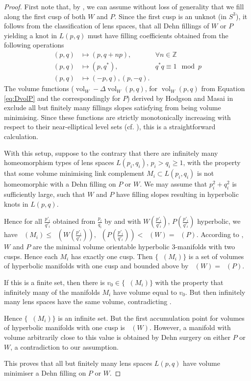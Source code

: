 \documentclass[a4paper]{gtart}
\theoremstyle{definition}
\theoremstyle{remark}
\numberwithin{equation}{section}
\DeclareMathOperator{\vol}{vol}
\DeclareMathOperator{\volh}{vol_{\mathbb{H}}}
\begin{document}
\begin{proof}
First note that, by , we can assume without loss of generality that we fill along the first cusp of both $W$ and $P$. Since the first cusp is an unknot (in $S^3$), it follows from the classification of lens spaces, that all Dehn fillings of $W$ or $P$ yielding a knot in $L(p,q)$ must have filling coefficients obtained from the following operations
\begin{align}
  (p,q) &\mapsto (p,q+np), & \forall n \in \mathbb{Z} \label{lenspace_1}\\
  (p,q) &\mapsto (p,q^*), & q^*q \equiv 1 \mod p \label{lenspace_2}\\
  (p,q) &\mapsto (-p,q), (p,-q).  \label{lenspace_3}
\end{align}
The volume functions ($\vol_W-\Delta \vol_W(p,q)$, for $\vol_W(p,q)$ from Equation \ref{eq:DvolP} and the correspondingly for $P$) derived by Hodgson and Masai in \cite{Hodgson_Masai} exclude all but finitely many fillings slopes satisfying  from being volume minimising. 
Since these functions are strictly monotonically increasing with respect to their near-elliptical level sets (cf. ), this is a straightforward calculation.

With this setup, suppose to the contrary that there are infinitely many homeomorphism types of lens spaces $L(p_i,q_i)$, $p_i > q_i \geq 1$, with the property that some volume minimising link complement $M_i \subset L(p_i,q_i)$ is not homeomorphic with a Dehn filling on $P$ or $W.$ We may assume that $p_i^2 + q_i^2$ is sufficiently large, such that $W$ and $P$ have filling slopes resulting in hyperbolic knots in $L(p,q)$.

Hence for all $\frac{p'_i}{q'_i}$ obtained from $\frac{p_i}{q_i}$ by  and with $W(\frac{p'_i}{q'_i})$, $P(\frac{p'_i}{q'_i})$ hyperbolic, we have $\volh(M_i) \le \volh(W(\frac{p'_i}{q'_i})),\volh(P(\frac{p'_i}{q'_i})) < \volh(W) = \volh(P)$. According to \cite{agol-2cusped}, $W$ and $P$ are the minimal volume orientable hyperbolic 3-manifolds with two cusps. Hence each $M_i$ has exactly one cusp.
Then $\{ \volh(M_i)\}$ is a set of volumes of hyperbolic manifolds with one cusp and bounded above by $\volh(W) = \volh(P).$ 

If this is a finite set, then there is $v_0\in \{ \volh(M_i)\}$ with the property that infinitely many of the manifolds $M_i$ have volume equal to $v_0.$ But then infinitely many lens spaces have the same volume, contradicting .

Hence $\{ \volh(M_i)\}$ is an infinite set. But the first accumulation point for volumes of hyperbolic manifolds with one cusp is $\volh(W).$ However, a manifold with volume arbitrarily close to this value is obtained by Dehn surgery on either $P$ or $W$, a contradiction to our assumption.

This proves that all but finitely many lens spaces $L(p,q)$ have volume minimiser a Dehn filling on $P$ or $W.$ 
\end{proof}
\end{document}
